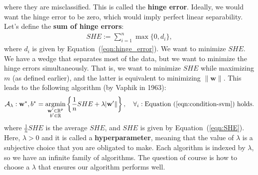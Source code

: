 \documentclass[12pt, a4paper]{article}
\theoremstyle{definition}
\begin{document}
	where they are misclassified. This is called the \textbf{hinge error}.
	Ideally, we would want the hinge error to be zero, which would imply perfect linear separability.
	Let's define the \textbf{sum of hinge errors}:
	\begin{align}
		SHE := \sum_{i=1}^{n}\max\{0, d_i\},\label{eqn:SHE}
	\end{align}
	where $d_i$ is given by Equation~(\ref{eqn:hinge_error}).
	We want to minimize $SHE$. We have a wedge that separates most of the data, but we want
	to minimize the hinge errors simultaneously. That is, we want to minimize $SHE$
	while maximizing $m$ (as defined earlier), and the latter is equivalent to minimizing $\|\mathbf{w}\|$.
	This leads to the following algorithm (by Vaphik in 1963):
	\begin{align*}
		\mathcal{A}_{\lambda}:\mathbf{w}^*, b^*=
		\underset{\substack{\mathbf{w}'\in\mathbb{R}^p \\b'\in\mathbb{R}}}{\text{argmin}}
		\left\{\frac{1}{n}SHE+\lambda |\mathbf{w}'\|\right\}
		,\quad \forall_i:\text{Equation (\ref{eqn:condition-svm}) holds.}
	\end{align*}
	where $\frac{1}{n}SHE$ is the average $SHE$, and $SHE$ is given by Equation~(\ref{eqn:SHE}).
	Here, $\lambda>0$ and it is called a \textbf{hyperparameter}, meaning that the value of $\lambda$
	is a subjective choice that you are obligated to make. Each algorithm is indexed by
	$\lambda$, so we have an infinite family of algorithms. The question of course is how
	to choose a $\lambda$ that ensures our algorithm performs well.
	\pagebreak
\end{document}
